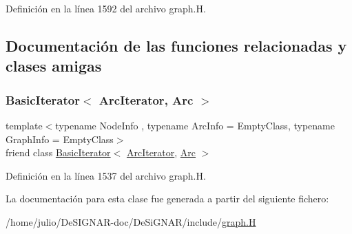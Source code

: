 Definición en la línea 1592 del archivo graph.\+H.



\subsection{Documentación de las funciones relacionadas y clases amigas}
\mbox{\label{class_designar_1_1_graph_1_1_arc_iterator_a530ad7c7218fa9b74a5cce004d0e3a1c}} 
\subsubsection{\texorpdfstring{Basic\+Iterator$<$ Arc\+Iterator, Arc $>$}{BasicIterator< ArcIterator, Arc >}}
{\footnotesize\ttfamily template$<$typename Node\+Info , typename Arc\+Info  = Empty\+Class, typename Graph\+Info  = Empty\+Class$>$ \\
friend class \hyperlink{class_designar_1_1_basic_iterator}{Basic\+Iterator}$<$ \hyperlink{class_designar_1_1_graph_1_1_arc_iterator}{Arc\+Iterator}, \hyperlink{class_designar_1_1_graph_a74c730ef4ce2d20f998d72bd25c2b5bf}{Arc} $>$\hspace{0.3cm}{\ttfamily [friend]}}



Definición en la línea 1537 del archivo graph.\+H.



La documentación para esta clase fue generada a partir del siguiente fichero\+:\begin{DoxyCompactItemize}
\item 
/home/julio/\+De\+S\+I\+G\+N\+A\+R-\/doc/\+De\+Si\+G\+N\+A\+R/include/\hyperlink{graph_8_h}{graph.\+H}\end{DoxyCompactItemize}
